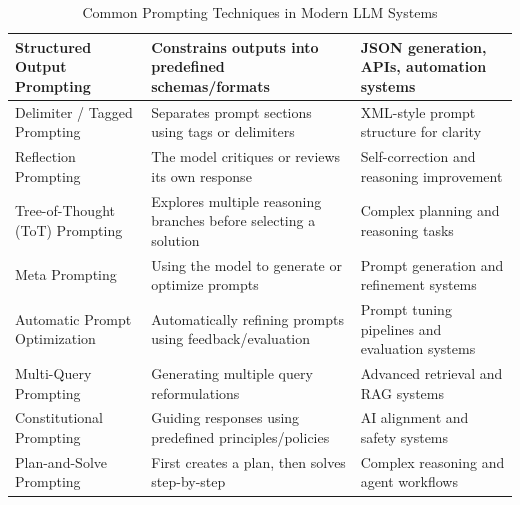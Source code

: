 \documentclass[10pt,a4paper]{article}
\begin{document}
\begin{table}[H]
\begin{tabular}{|p{3.9cm}|p{6.2cm}|p{5cm}|}
\hline

Structured Output Prompting &
Constrains outputs into predefined schemas/formats &
JSON generation, APIs, automation systems \\

\hline

Delimiter / Tagged Prompting &
Separates prompt sections using tags or delimiters &
XML-style prompt structure for clarity \\

\hline

Reflection Prompting &
The model critiques or reviews its own response &
Self-correction and reasoning improvement \\

\hline

Tree-of-Thought (ToT) Prompting &
Explores multiple reasoning branches before selecting a solution &
Complex planning and reasoning tasks \\

\hline

Meta Prompting &
Using the model to generate or optimize prompts &
Prompt generation and refinement systems \\

\hline

Automatic Prompt Optimization &
Automatically refining prompts using feedback/evaluation &
Prompt tuning pipelines and evaluation systems \\

\hline

Multi-Query Prompting &
Generating multiple query reformulations &
Advanced retrieval and RAG systems \\

\hline

Constitutional Prompting &
Guiding responses using predefined principles/policies &
AI alignment and safety systems \\

\hline

Plan-and-Solve Prompting &
First creates a plan, then solves step-by-step &
Complex reasoning and agent workflows \\

\hline

\end{tabular}

\caption{Common Prompting Techniques in Modern LLM Systems}
\label{tab:prompting-techniques}

\end{table}
\end{document}
